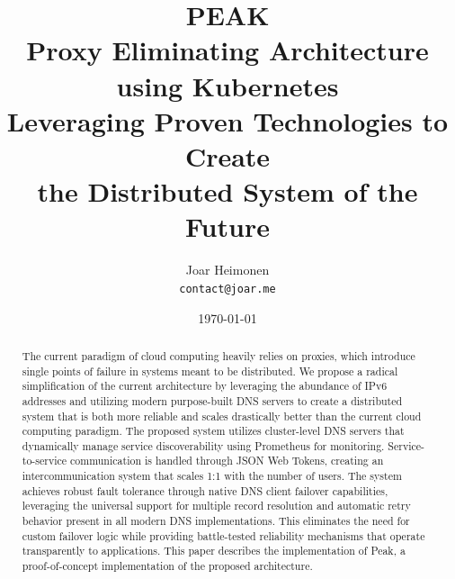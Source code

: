\documentclass[12pt]{article}
\author{
    Joar Heimonen\\
    \texttt{contact@joar.me}
}
\title{
    \textbf{PEAK}\\[0.5em]
    \large \textbf{P}roxy \textbf{E}liminating \textbf{A}rchitecture using \textbf{K}ubernetes\\[0.3em]
    \large Leveraging Proven Technologies to Create\\
    the Distributed System of the Future
}
\date{\today}
\begin{document}
\maketitle

\begin{abstract}
    \noindent The current paradigm of cloud computing heavily relies on proxies, which introduce single points of failure in systems meant to be distributed. 
    We propose a radical simplification of the current architecture by leveraging the abundance of IPv6 addresses and utilizing modern purpose-built 
    DNS servers to create a distributed system that is both more reliable and scales drastically better than the current cloud computing paradigm. 
    The proposed system utilizes cluster-level DNS servers that dynamically manage service discoverability using Prometheus for monitoring. 
    Service-to-service communication is handled through JSON Web Tokens, creating an intercommunication system that scales 1:1 with the number of users. 
    The system achieves robust fault tolerance through native DNS client failover capabilities, leveraging the universal support for multiple 
    record resolution and automatic retry behavior present in all modern DNS implementations. 
    This eliminates the need for custom failover logic while providing battle-tested reliability mechanisms that operate transparently to applications. 
    This paper describes the implementation of Peak, a proof-of-concept implementation of the proposed architecture.
\end{abstract}

\pagebreak

\tableofcontents

\pagebreak
\end{document}
